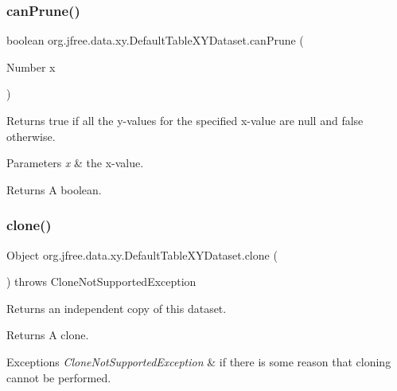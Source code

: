 \subsubsection{\texorpdfstring{can\+Prune()}{canPrune()}}
{\footnotesize\ttfamily boolean org.\+jfree.\+data.\+xy.\+Default\+Table\+X\+Y\+Dataset.\+can\+Prune (\begin{DoxyParamCaption}\item[{Number}]{x }\end{DoxyParamCaption})\hspace{0.3cm}{\ttfamily [protected]}}

Returns {\ttfamily true} if all the y-\/values for the specified x-\/value are {\ttfamily null} and {\ttfamily false} otherwise.


\begin{DoxyParams}{Parameters}
{\em x} & the x-\/value.\\
\hline
\end{DoxyParams}
\begin{DoxyReturn}{Returns}
A boolean. 
\end{DoxyReturn}
\mbox{\label{classorg_1_1jfree_1_1data_1_1xy_1_1_default_table_x_y_dataset_aad4a34969562e9b961e4f5031e9729ba}} 
\subsubsection{\texorpdfstring{clone()}{clone()}}
{\footnotesize\ttfamily Object org.\+jfree.\+data.\+xy.\+Default\+Table\+X\+Y\+Dataset.\+clone (\begin{DoxyParamCaption}{ }\end{DoxyParamCaption}) throws Clone\+Not\+Supported\+Exception}

Returns an independent copy of this dataset.

\begin{DoxyReturn}{Returns}
A clone.
\end{DoxyReturn}

\begin{DoxyExceptions}{Exceptions}
{\em Clone\+Not\+Supported\+Exception} & if there is some reason that cloning cannot be performed. \\
\hline
\end{DoxyExceptions}
\mbox{\label{classorg_1_1jfree_1_1data_1_1xy_1_1_default_table_x_y_dataset_abf263751a023a3c112efb013d0cbfb42}} 
